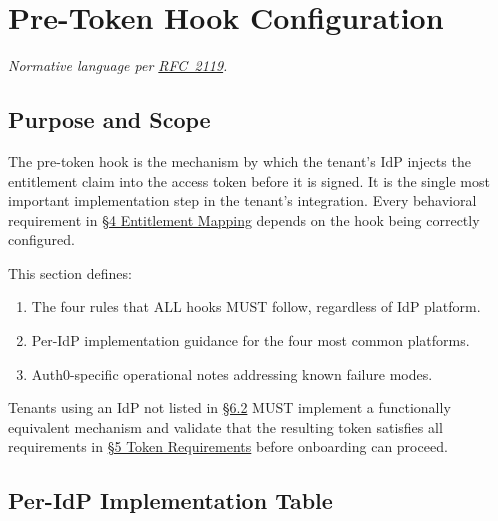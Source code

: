 \section{Pre-Token Hook Configuration}\label{sec:hook-configuration}

\textit{Normative language per \href{https://tools.ietf.org/html/rfc2119}{RFC~2119}.}

\subsection{Purpose and Scope}

The pre-token hook is the mechanism by which the tenant's IdP injects the entitlement
claim into the access token before it is signed. It is the single most important
implementation step in the tenant's integration. Every behavioral requirement in
\hyperref[sec:entitlement-mapping]{\S4 Entitlement Mapping} depends on the hook being correctly configured.


This section defines:

\begin{enumerate}
  \item The four rules that ALL hooks MUST follow, regardless of IdP platform.
  \item Per-IdP implementation guidance for the four most common platforms.
  \item Auth0-specific operational notes addressing known failure modes.
\end{enumerate}

Tenants using an IdP not listed in \hyperref[sec:per-idp-implementation]{\S6.2} 
MUST implement a functionally equivalent mechanism and validate that the resulting 
token satisfies all requirements in 
\hyperref[sec:token-requirements]{\S5 Token Requirements} before onboarding can proceed.

\subsection{Per-IdP Implementation Table} \label{sec:per-idp-implementation}


